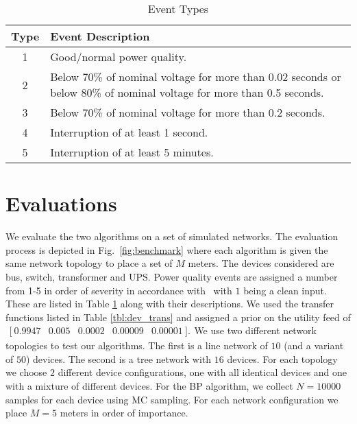 \begin{table}[!t]
\centering
\small
\caption{Event Types}
\label{EventDescriptions}
{\renewcommand{\arraystretch}{1.0}
\begin{tabular}{|c|p{}|}
\hline 
Type  & Event Description\tabularnewline
\hline 
1  & Good/normal power quality.\tabularnewline
2  & Below 70\% of nominal voltage for more than 0.02 seconds or below 80\% of nominal voltage for more than 0.5 seconds.\tabularnewline
3  & Below 70\% of nominal voltage for more than 0.2 seconds.\tabularnewline
4  & Interruption of at least 1 second.\tabularnewline
5  & Interruption of at least 5 minutes.\tabularnewline
\hline 
\end{tabular}}
\end{table}


\section{Evaluations}
\label{sec:experiments}
We evaluate the two algorithms on a set of simulated networks. The evaluation process is depicted in Fig.~\ref{fig:benchmark} where each algorithm is given the same network topology to place a set of $M$ meters. The devices considered are bus, switch, transformer and UPS. Power quality events are assigned a number from 1-5 in order of severity in accordance with~\cite{epri2002} with $1$ being a clean input. These are listed in Table \ref{EventDescriptions} along with their descriptions. We used the transfer functions listed in Table \ref{tbl:dev_trans} and assigned a prior on the utility feed of $\begin{array}{ccccc}[\ 0.9947 & 0.005 & 0.0002 & 0.00009 & 0.00001\ ].\end{array}$We use two different network topologies to test our algorithms. The first is a line network of $10$ (and a variant of $50$) devices. The second is a tree network with $16$ devices. For each topology we choose $2$ different device configurations, one with all identical devices and one with a mixture of different devices. For the BP algorithm, we collect $N=10000$ samples for each device using MC sampling. For each network configuration we place $M=5$ meters in order of importance.

